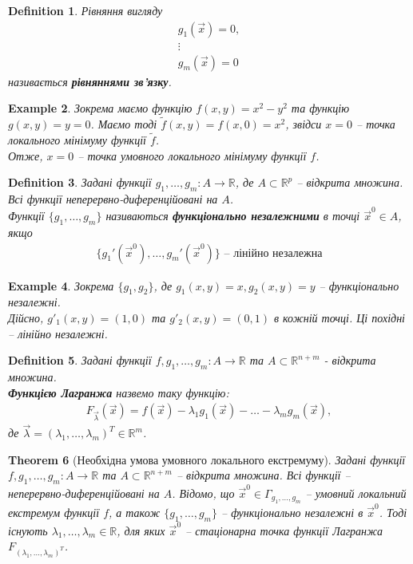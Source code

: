 \documentclass[a4paper, 10pt]{article}
\theoremstyle{theoremdd}
\newtheorem{theorem}{Theorem}[subsection]
\theoremstyle{theoremdd}
\theoremstyle{theoremdd}
\newtheorem{definition}[theorem]{Definition}
\theoremstyle{theoremdd}
\theoremstyle{theoremdd}
\newtheorem{example}[theorem]{Example}
\theoremstyle{theoremdd}
\theoremstyle{theoremdd}
\theoremstyle{theoremdd}
\theoremstyle{theoremdd}
\begin{document}
\begin{definition}
Рівняння вигляду
\begin{align*}
g_1(\vec{x}) = 0,\\
\vdots \\
g_m(\vec{x}) = 0
\end{align*}
називається \textbf{рівняннями зв'язку}.
\end{definition}

\begin{example}
Зокрема маємо функцію $f(x,y) = x^2-y^2$ та функцію $g(x,y) = y = 0$. Маємо тоді $\tilde{f}(x,y) = f(x,0) = x^2$, звідси $x = 0$ -- точка локального мінімуму функції $\tilde{f}$.\\
Отже, $x = 0$ -- точка умовного локального мінімуму функції $f$.
\end{example}

\begin{definition}
Задані функції $g_1,\dots,g_m\colon A \to \mathbb{R}$, де $A \subset \mathbb{R}^p$ -- відкрита множина. Всі функції неперервно-диференційовані на $A$.\\
Функції $\{g_1,\dots,g_m\}$ називаються \textbf{функціонально незалежними} в точці $\vec{x}^0 \in A$, якщо
\begin{align*}
\{g_1'(\vec{x}^0),\dots,g_m'(\vec{x}^0)\} \text{ -- лінійно незалежна}
\end{align*}
\end{definition}

\begin{example}
Зокрема $\{g_1,g_2\}$, де $g_1(x,y) = x, g_2(x,y) = y$ -- функціонально незалежні.\\
Дійсно, $g'_1(x,y) = (1,0)$ та $g'_2(x,y) = (0,1)$ в кожній точці. Ці похідні -- лінійно незалежні.
\end{example}

\begin{definition}
Задані функції $f,g_1,\dots,g_m\colon A \to \mathbb{R}$ та $A \subset \mathbb{R}^{n+m}$ - відкрита множина.\\
\textbf{Функцією Лагранжа} назвемо таку функцію:
\begin{align*}
F_{\vec{\lambda}}(\vec{x}) = f(\vec{x}) - \lambda_1g_1(\vec{x}) - \dots - \lambda_m g_m(\vec{x}),
\end{align*}
де $\vec{\lambda} = (\lambda_1,\dots,\lambda_m)^T \in \mathbb{R}^m$.
\end{definition}

\begin{theorem}[Необхідна умова умовного локального екстремуму]
Задані функції $f,g_1,\dots,g_m\colon A \to \mathbb{R}$ та $A \subset \mathbb{R}^{n+m}$ -- відкрита множина. Всі функції -- неперервно-диференційовані на $A$. Відомо, що $\vec{x}^0 \in \Gamma_{g_1,\dots,g_m}$ -- умовний локальний екстремум функції $f$, а також $\{g_1,\dots,g_m\}$ -- функціонально незалежні в $\vec{x}^0$. Тоді існують $\lambda_1,\dots,\lambda_m \in \mathbb{R}$, для яких $\vec{x}^0$ -- стаціонарна точка функції Лагранжа $F_{(\lambda_1,\dots,\lambda_m)^T}$.
\end{theorem}
\end{document}
